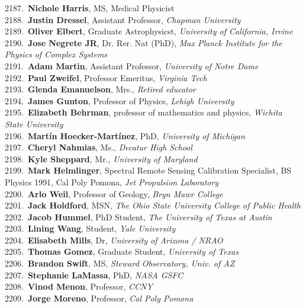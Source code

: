 2187.~{\bf Nichole Harris}, MS, Medical Physicist \\
2188.~{\bf Justin Dressel}, Assistant Professor, {\sl Chapman University} \\
2189.~{\bf Oliver Elbert}, Graduate Astrophysicst, {\sl University of California, Irvine} \\
2190.~{\bf Jose Negrete JR}, Dr. Rer. Nat (PhD), {\sl Max Planck Institute for the Physics of Complex Systems} \\
2191.~{\bf Adam Martin}, Assistant Professor, {\sl University of Notre Dame} \\
2192.~{\bf Paul Zweifel}, Professor Emeritus, {\sl Virginia Tech} \\
2193.~{\bf Glenda Emanuelson}, Mrs., {\sl Retired educator} \\
2194.~{\bf James Gunton}, Professor of Physics, {\sl Lehigh University} \\
2195.~{\bf Elizabeth Behrman}, professor of mathematics and physics, {\sl Wichita State University} \\
2196.~{\bf Mart\'{i}n Hoecker-Mart\'{i}nez}, PhD, {\sl University of Michigan} \\
2197.~{\bf Cheryl Nahmias}, Ms., {\sl Decatur High School} \\
2198.~{\bf Kyle Sheppard}, Mr., {\sl University of Maryland} \\
2199.~{\bf Mark Helmlinger}, Spectral Remote Sensing Calibration Specialist, BS Physics 1991, Cal Poly Pomona, {\sl Jet Propulsion Laboratory} \\
2200.~{\bf Arlo Weil}, Professor of Geology, {\sl Bryn Mawr College } \\
2201.~{\bf Jack Holdford}, MSN, {\sl The Ohio State University College of Public Health} \\
2202.~{\bf Jacob Hummel}, PhD Student, {\sl The University of Texas at Austin} \\
2203.~{\bf Lining Wang}, Student, {\sl Yale University } \\
2204.~{\bf Elisabeth Mills}, Dr, {\sl University of Arizona / NRAO} \\
2205.~{\bf Thomas Gomez}, Graduate Student, {\sl University of Texas} \\
2206.~{\bf Brandon Swift}, MS, {\sl Steward Observatory, Univ. of AZ} \\
2207.~{\bf Stephanie LaMassa}, PhD, {\sl NASA GSFC} \\
2208.~{\bf Vinod Menon}, Professor, {\sl CCNY} \\
2209.~{\bf Jorge Moreno}, Professor, {\sl Cal Poly Pomona} \\
